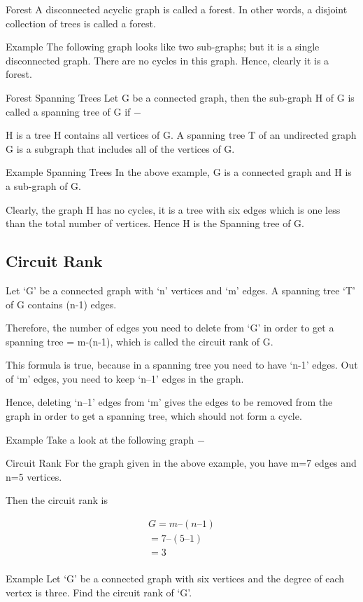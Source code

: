 Forest
A disconnected acyclic graph is called a forest. In other words, a disjoint collection of trees is called a forest.

Example
The following graph looks like two sub-graphs; but it is a single disconnected graph. There are no cycles in this graph. Hence, clearly it is a forest.

Forest
Spanning Trees
Let G be a connected graph, then the sub-graph H of G is called a spanning tree of G if −

H is a tree
H contains all vertices of G.
A spanning tree T of an undirected graph G is a subgraph that includes all of the vertices of G.

Example
Spanning Trees
In the above example, G is a connected graph and H is a sub-graph of G.

Clearly, the graph H has no cycles, it is a tree with six edges which is one less than the total number of vertices. Hence H is the Spanning tree of G.

\subsection{Circuit Rank}
Let ‘G’ be a connected graph with ‘n’ vertices and ‘m’ edges. A spanning tree ‘T’ of G contains (n-1) edges.

Therefore, the number of edges you need to delete from ‘G’ in order to get a spanning tree = m-(n-1), which is called the circuit rank of G.

This formula is true, because in a spanning tree you need to have ‘n-1’ edges. Out of ‘m’ edges, you need to keep ‘n–1’ edges in the graph.

Hence, deleting ‘n–1’ edges from ‘m’ gives the edges to be removed from the graph in order to get a spanning tree, which should not form a cycle.

Example
Take a look at the following graph −

Circuit Rank
For the graph given in the above example, you have m=7 edges and n=5 vertices.

Then the circuit rank is

\begin{eqnarray}
G = m – (n – 1)\\
  = 7 – (5 – 1)\\
  = 3\\
\end{eqnarray}

Example
Let ‘G’ be a connected graph with six vertices and the degree of each vertex is three. Find the circuit rank of ‘G’.

